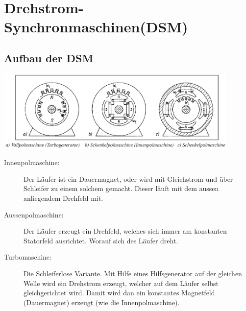 \section{Drehstrom- Synchronmaschinen(DSM)}
    \subsection{Aufbau der DSM}
        \includegraphics[width=12cm]{./images/Aufbau_DSM.png}\\
        \begin{description}
            \item[Innenpolmaschine:] Der Läufer ist ein Dauermagnet, oder wird mit Gleichstrom und über Schleifer
            zu einem solchem gemacht. Dieser läuft mit dem aussen anliegendem Drehfeld mit.
            \item[Aussenpolmaschine:] Der Läufer erzeugt ein Drehfeld, welches sich immer am konstanten Statorfeld
            ausrichtet. Worauf sich des Läufer dreht.
            \item[Turbomaschine:] Die Schleiferlose Variante. Mit Hilfe eines Hilfsgenerator auf der gleichen Welle
            wird ein Drehstrom erzeugt, welcher auf dem Läufer selbst gleichgerichtet wird. Damit wird dan ein
            konstantes Magnetfeld (Dauermagnet) erzeugt (wie die Innenpolmaschine).
        \end{description}
